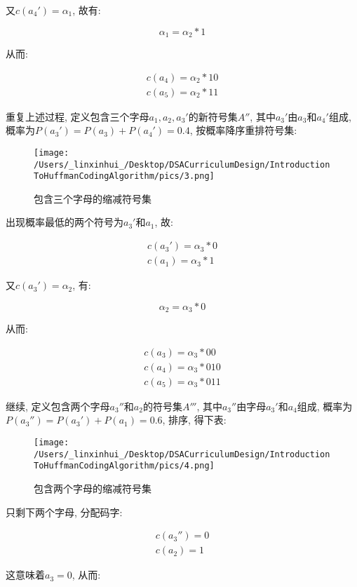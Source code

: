 \documentclass{article}
\begin{document}
\begin{CJK}{UTF8}{gbsn}
又\(c(a_4') = \alpha_1\), 故有:

\[\alpha_1 = \alpha_2 * 1\]

从而:

\begin{gather*}
c(a_4) = \alpha_2 * 10 \\
c(a_5) = \alpha_2 * 11
\end{gather*}

重复上述过程, 定义包含三个字母\(a_1, a_2, a_3'\)的新符号集\(A''\),
其中\(a_3'\)由\(a_3\)和\(a_4'\)组成,
概率为\(P(a_3') = P(a_3) + P(a_4') = 0.4\), 按概率降序重排符号集:

\begin{figure}[H]
\centering
\texttt{[image: /Users/\_linxinhui\_/Desktop/DSACurriculumDesign/IntroductionToHuffmanCodingAlgorithm/pics/3.png]}
\caption{包含三个字母的缩减符号集}
\end{figure}

出现概率最低的两个符号为\(a_3'\)和\(a_1\), 故:

\begin{gather*}
c(a_3') = \alpha_3 * 0\\
c(a_1) = \alpha_3 * 1
\end{gather*}

又\(c(a_3') = \alpha_2\), 有:

\[\alpha_2 = \alpha_3 * 0\]

从而:

\begin{gather*}
c(a_3) = \alpha_3 * 00 \\
c(a_4) = \alpha_3 * 010 \\
c(a_5) = \alpha_3 * 011
\end{gather*}

继续, 定义包含两个字母\(a_3''\)和\(a_2\)的符号集\(A'''\),
其中\(a_3''\)由字母\(a_3'\)和\(a_4\)组成,
概率为\(P(a_3'') = P(a_3') + P(a_1) = 0.6\), 排序, 得下表:

\begin{figure}[H]
\centering
\texttt{[image: /Users/\_linxinhui\_/Desktop/DSACurriculumDesign/IntroductionToHuffmanCodingAlgorithm/pics/4.png]}
\caption{包含两个字母的缩减符号集}
\end{figure}

只剩下两个字母, 分配码字:

\begin{gather*}
c(a_3'') = 0 \\
c(a_2) = 1
\end{gather*}

这意味着\(a_3 = 0\), 从而:


\end{CJK}
\end{document}
